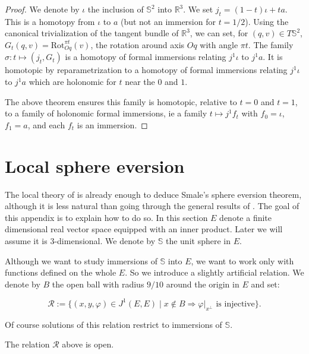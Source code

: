 \documentclass[10pt,a4paper]{article}
\newcounter{chapter}
\newcommand{\Rel}{\mathcal{R}} %
\newcommand{\rst}[2]{#1|_{#2}}
\newcommand{\uses}[1]{}
\newcommand{\lean}[1]{}
\newcommand{\leanok}{}
\begin{document}
\begin{proof}
  \leanok
  \uses{thm:open_ample, lem:open_ample_immersion}
	We denote by $ι$ the inclusion of $𝕊^2$ into $ℝ^3$.
	We set $j_t = (1-t)ι	+ ta$.
  This is a homotopy from $ι$ to $a$ (but not an immersion for $t=1/2$).
  Using the canonical trivialization of the tangent
	bundle of $ℝ^3$, we can set, for $(q, v) ∈ T𝕊^2$,
	$G_t(q, v) = \mathrm{Rot}_{Oq}^{πt}(v)$, the rotation around axis $Oq$ with
	angle $πt$.
  The family $σ : t ↦ (j_t, G_t)$ is a homotopy of formal immersions
  relating $j^1ι$ to $j^1a$.
  It is homotopic by reparametrization to a homotopy of formal immersions
  relating $j^1ι$ to $j^1a$ which are holonomic for $t$ near the
  $0$ and $1$.

  The above theorem ensures this family is homotopic,
	relative to $t = 0$ and $t = 1$, to a family of holonomic formal immersions,
	ie a family $t ↦ j^1f_t$ with $f_0 = ι$, $f_1 = a$, and each $f_t$ is an
	immersion.
\end{proof}


\chapter{Local sphere eversion}
\label{chap:local_eversion}

The local theory of  is already enough to deduce
Smale's sphere eversion theorem, although it is less natural than going through
the general results of . The goal of this appendix is to
explain how to do so. In this section $E$ denote a finite dimensional real
vector space equipped with an inner product. Later we will assume it is
3-dimensional. We denote by $𝕊$ the unit sphere in $E$.

Although we want to study immersions of $𝕊$ into $E$, we want to work only with
functions defined on the whole $E$. So we introduce a slightly artificial relation.
We denote by $B$ the open ball with radius $9/10$ around the origin in $E$ and set:

\[
  \Rel := \{(x, y, φ) ∈ J^1(E, E) \;|\; x ∉ B ⇒ \rst{φ}{x^⊥} \text{ is injective}\}.
\]

Of course solutions of this relation restrict to immersions of $𝕊$.

\begin{lemma}
  \label{lem:loc_immersion_rel_open}
  \lean{loc_immersion_rel_open}
  \leanok
  The relation $\Rel$ above is open.
\end{lemma}
\end{document}
